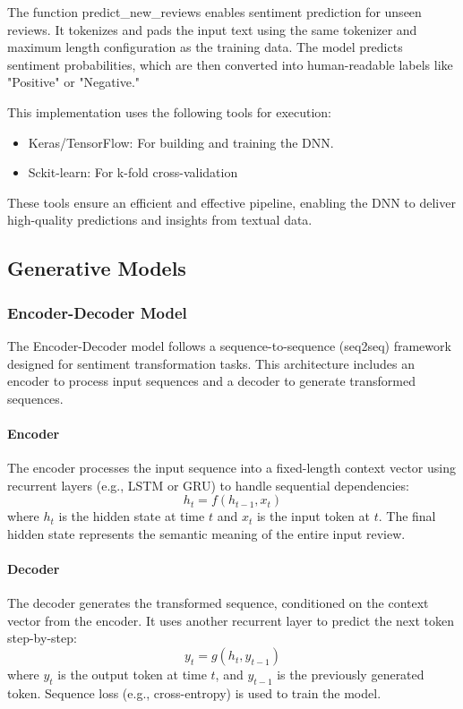 \documentclass{article}
\begin{document}
The function predict\_new\_reviews enables sentiment prediction for unseen reviews. It tokenizes and pads the input text using the same tokenizer and maximum length configuration as the training data. The model predicts sentiment probabilities, which are then converted into human-readable labels like "Positive" or "Negative."

This implementation uses the following tools for execution:
\begin{itemize}
    \item Keras/TensorFlow: For building and training the DNN.
    \item Sckit-learn: For k-fold cross-validation
\end{itemize}

These tools ensure an efficient and effective pipeline, enabling the DNN to deliver high-quality predictions and insights from textual data.

\subsection{Generative Models}

\subsubsection{Encoder-Decoder Model}
The Encoder-Decoder model follows a sequence-to-sequence (seq2seq) framework designed for sentiment transformation tasks. This architecture includes an encoder to process input sequences and a decoder to generate transformed sequences.

\paragraph{Encoder}
The encoder processes the input sequence into a fixed-length context vector using recurrent layers (e.g., LSTM or GRU) to handle sequential dependencies:
\[
h_t = f(h_{t-1}, x_t)
\]
where \(h_t\) is the hidden state at time \(t\) and \(x_t\) is the input token at \(t\). The final hidden state represents the semantic meaning of the entire input review.

\paragraph{Decoder}
The decoder generates the transformed sequence, conditioned on the context vector from the encoder. It uses another recurrent layer to predict the next token step-by-step:
\[
y_t = g(h_t, y_{t-1})
\]
where \(y_t\) is the output token at time \(t\), and \(y_{t-1}\) is the previously generated token. Sequence loss (e.g., cross-entropy) is used to train the model.
\end{document}
